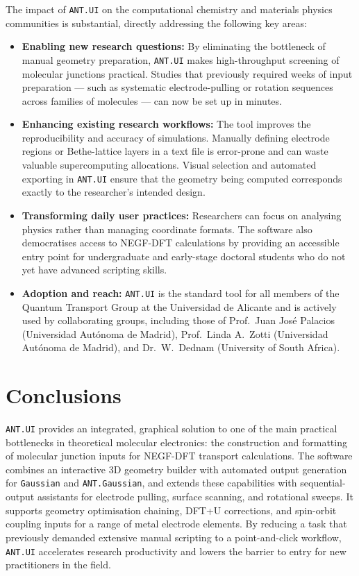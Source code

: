 \documentclass[preprint,12pt, a4paper]{elsarticle}
\begin{document}
The impact of \texttt{ANT.UI} on the computational chemistry and materials physics communities is substantial, directly addressing the following key areas:

\begin{itemize}
    \item \textbf{Enabling new research questions:} By eliminating the bottleneck of manual geometry preparation, \texttt{ANT.UI} makes high-throughput screening of molecular junctions practical. Studies that previously required weeks of input preparation — such as systematic electrode-pulling or rotation sequences across families of molecules — can now be set up in minutes.

    \item \textbf{Enhancing existing research workflows:} The tool improves the reproducibility and accuracy of simulations. Manually defining electrode regions or Bethe-lattice layers in a text file is error-prone and can waste valuable supercomputing allocations. Visual selection and automated exporting in \texttt{ANT.UI} ensure that the geometry being computed corresponds exactly to the researcher's intended design.

    \item \textbf{Transforming daily user practices:} Researchers can focus on analysing physics rather than managing coordinate formats. The software also democratises access to NEGF-DFT calculations by providing an accessible entry point for undergraduate and early-stage doctoral students who do not yet have advanced scripting skills.

    \item \textbf{Adoption and reach:} \texttt{ANT.UI} is the standard tool for all members of the Quantum Transport Group at the Universidad de Alicante and is actively used by collaborating groups, including those of Prof.\ Juan José Palacios (Universidad Autónoma de Madrid), Prof.\ Linda A.\ Zotti (Universidad Autónoma de Madrid), and Dr.\ W.\ Dednam (University of South Africa).
\end{itemize}

\section{Conclusions}

\texttt{ANT.UI} provides an integrated, graphical solution to one of the main practical bottlenecks in theoretical molecular electronics: the construction and formatting of molecular junction inputs for NEGF-DFT transport calculations. The software combines an interactive 3D geometry builder with automated output generation for \texttt{Gaussian} and \texttt{ANT.Gaussian}, and extends these capabilities with sequential-output assistants for electrode pulling, surface scanning, and rotational sweeps. It supports geometry optimisation chaining, DFT+U corrections, and spin-orbit coupling inputs for a range of metal electrode elements. By reducing a task that previously demanded extensive manual scripting to a point-and-click workflow, \texttt{ANT.UI} accelerates research productivity and lowers the barrier to entry for new practitioners in the field.
\end{document}
